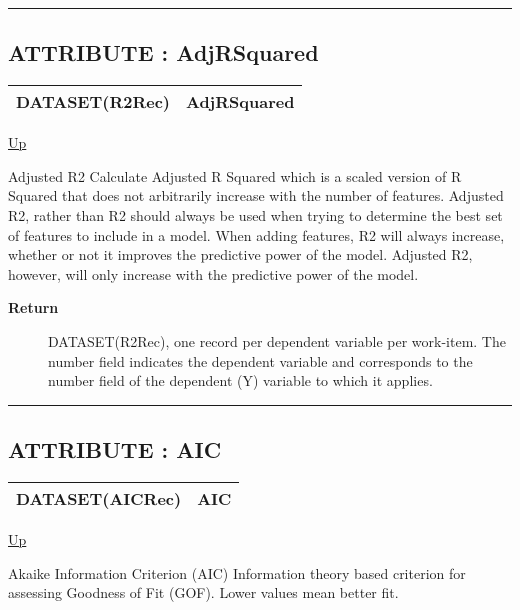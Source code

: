 \rule{\textwidth}{0.4pt}
\subsection*{ATTRIBUTE : AdjRSquared}
\hypertarget{ecldoc:linearregression.ols.adjrsquared}{}

{\renewcommand{\arraystretch}{1.5}
\begin{tabularx}{\textwidth}{|>{\raggedright\arraybackslash}l|X|}
\hline
\hspace{0pt}DATASET(R2Rec) & AdjRSquared \\
\hline
\end{tabularx}
}

\hyperlink{ecldoc:linearregression.ols}{Up}

\par
Adjusted R2 Calculate Adjusted R Squared which is a scaled version of R Squared that does not arbitrarily increase with the number of features. Adjusted R2, rather than R2 should always be used when trying to determine the best set of features to include in a model. When adding features, R2 will always increase, whether or not it improves the predictive power of the model. Adjusted R2, however, will only increase with the predictive power of the model.

\par
\begin{description}
\item [\textbf{Return}] DATASET(R2Rec), one record per dependent variable per work-item. The number field indicates the dependent variable and corresponds to the number field of the dependent (Y) variable to which it applies.
\end{description}

\rule{\textwidth}{0.4pt}
\subsection*{ATTRIBUTE : AIC}
\hypertarget{ecldoc:linearregression.ols.aic}{}

{\renewcommand{\arraystretch}{1.5}
\begin{tabularx}{\textwidth}{|>{\raggedright\arraybackslash}l|X|}
\hline
\hspace{0pt}DATASET(AICRec) & AIC \\
\hline
\end{tabularx}
}

\hyperlink{ecldoc:linearregression.ols}{Up}

\par
Akaike Information Criterion (AIC) Information theory based criterion for assessing Goodness of Fit (GOF). Lower values mean better fit.

